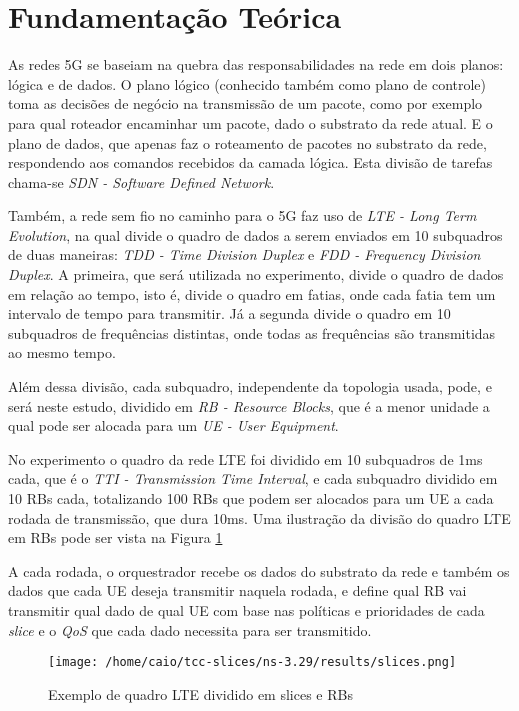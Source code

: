 \documentclass[11pt,twoside]{article}
\begin{document}
\section{Fundamentação Teórica}

	As redes 5G se baseiam na quebra das responsabilidades na rede em dois planos: lógica e de dados. O plano lógico (conhecido também como plano de controle) toma as decisões de negócio na transmissão de um pacote, como por exemplo para qual roteador encaminhar um pacote, dado o substrato da rede atual. E o plano de dados, que apenas faz o roteamento de pacotes no substrato da rede, respondendo aos comandos recebidos da camada lógica. Esta divisão de tarefas chama-se \textit{SDN - Software Defined Network}.
	
	Também, a rede sem fio no caminho para o 5G faz uso de \textit{LTE - Long Term Evolution}, na qual divide o quadro de dados a serem enviados em 10 subquadros de duas maneiras: \textit{TDD - Time Division Duplex} e \textit{FDD - Frequency Division Duplex}. A primeira, que será utilizada no experimento, divide o quadro de dados em relação ao tempo, isto é, divide o quadro em fatias, onde cada fatia tem um intervalo de tempo para transmitir. Já a segunda divide o quadro em 10 subquadros de frequências distintas, onde todas as frequências são transmitidas ao mesmo tempo.
	
	Além dessa divisão, cada subquadro, independente da topologia usada, pode, e será neste estudo, dividido em \textit{RB - Resource Blocks}, que é a menor unidade a qual pode ser alocada para um \textit{UE - User Equipment}.
	
	No experimento o quadro da rede LTE foi dividido em 10 subquadros de 1ms cada, que é o  \textit{TTI - Transmission Time Interval}, e cada subquadro dividido em 10 RBs cada, totalizando 100 RBs que podem ser alocados para um UE a cada rodada de transmissão, que dura 10ms. Uma ilustração da divisão do quadro LTE em RBs pode ser vista na Figura \ref{slices}
	
	A cada rodada, o orquestrador recebe os dados do substrato da rede e também os dados que cada UE deseja transmitir naquela rodada, e define qual RB vai transmitir qual dado de qual UE com base nas políticas e prioridades de cada \textit{slice} e o \textit{QoS} que cada dado necessita para ser transmitido.
	
	\begin{figure}[H]
		\centering
		\texttt{[image: /home/caio/tcc-slices/ns-3.29/results/slices.png]}
		\caption{Exemplo de quadro LTE dividido em slices e RBs}
		\label{slices}
	\end{figure}
\end{document}

